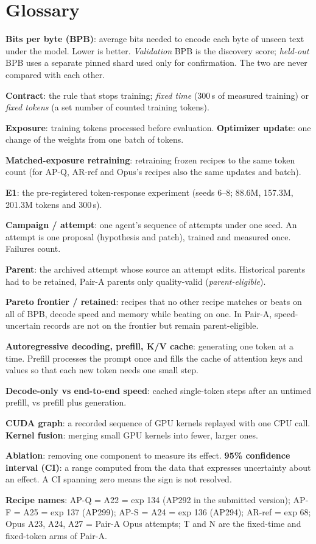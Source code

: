 \documentclass{article}
\newif\ifshowhumanmarkers \showhumanmarkersfalse
\newcommand{\humantag}[1]{{\color{humanframe}\sffamily\scriptsize\bfseries HUMAN AUTHOR MUST REWRITE/VERIFY [#1]}\ }
\newcommand{\humanauthor}[2][]{\ifshowhumanmarkers\begin{humanbox}\humantag{#1}#2\end{humanbox}\else #2\par\fi}
\begin{document}
\section{Glossary}\label{app:glossary}
\humanauthor[P2-01 Glossary]{\textbf{Bits per byte (BPB)}: average bits needed to encode each byte of unseen text under the model. Lower is better. \emph{Validation} BPB is the discovery score; \emph{held-out} BPB uses a separate pinned shard used only for confirmation. The two are never compared with each other.\par
\textbf{Contract}: the rule that stops training; \emph{fixed time} (300\,s of measured training) or \emph{fixed tokens} (a set number of counted training tokens).\par
\textbf{Exposure}: training tokens processed before evaluation. \textbf{Optimizer update}: one change of the weights from one batch of tokens.\par
\textbf{Matched-exposure retraining}: retraining frozen recipes to the same token count (for AP-Q, AR-ref and Opus's recipes also the same updates and batch).\par
\textbf{E1}: the pre-registered token-response experiment (seeds 6--8; 88.6M, 157.3M, 201.3M tokens and 300\,s).\par
\textbf{Campaign / attempt}: one agent's sequence of attempts under one seed. An attempt is one proposal (hypothesis and patch), trained and measured once. Failures count.\par
\textbf{Parent}: the archived attempt whose source an attempt edits. Historical parents had to be retained, Pair-A parents only quality-valid (\emph{parent-eligible}).\par
\textbf{Pareto frontier / retained}: recipes that no other recipe matches or beats on all of BPB, decode speed and memory while beating on one. In Pair-A, speed-uncertain records are not on the frontier but remain parent-eligible.\par
\textbf{Autoregressive decoding, prefill, K/V cache}: generating one token at a time. Prefill processes the prompt once and fills the cache of attention keys and values so that each new token needs one small step.\par
\textbf{Decode-only vs end-to-end speed}: cached single-token steps after an untimed prefill, vs prefill plus generation.\par
\textbf{CUDA graph}: a recorded sequence of GPU kernels replayed with one CPU call. \textbf{Kernel fusion}: merging small GPU kernels into fewer, larger ones.\par
\textbf{Ablation}: removing one component to measure its effect. \textbf{95\% confidence interval (CI)}: a range computed from the data that expresses uncertainty about an effect. A CI spanning zero means the sign is not resolved.\par
\textbf{Recipe names}: AP-Q = A22 = exp 134 (AP292 in the submitted version); AP-F = A25 = exp 137 (AP299); AP-S = A24 = exp 136 (AP294); AR-ref = exp 68; Opus A23, A24, A27 = Pair-A Opus attempts; T and N are the fixed-time and fixed-token arms of Pair-A.}
\end{document}
